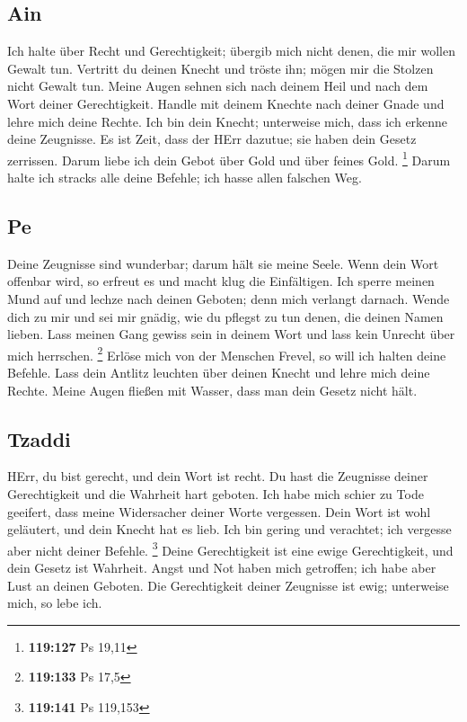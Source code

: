 \hypertarget{ain}{%
\subsection{Ain}\label{ain}}

 Ich halte über Recht und Gerechtigkeit; übergib mich
nicht denen, die mir wollen Gewalt tun.  Vertritt du
deinen Knecht und tröste ihn; mögen mir die Stolzen nicht Gewalt tun.
 Meine Augen sehnen sich nach deinem Heil und nach dem
Wort deiner Gerechtigkeit.  Handle mit deinem Knechte
nach deiner Gnade und lehre mich deine Rechte.  Ich bin
dein Knecht; unterweise mich, dass ich erkenne deine Zeugnisse.
 Es ist Zeit, dass der HErr dazutue; sie haben dein
Gesetz zerrissen.  Darum liebe ich dein Gebot über Gold
und über feines Gold. \footnote{\textbf{119:127} Ps 19,11}
 Darum halte ich stracks alle deine Befehle; ich hasse
allen falschen Weg.

\hypertarget{pe}{%
\subsection{Pe}\label{pe}}

 Deine Zeugnisse sind wunderbar; darum hält sie meine
Seele.  Wenn dein Wort offenbar wird, so erfreut es und
macht klug die Einfältigen.  Ich sperre meinen Mund auf
und lechze nach deinen Geboten; denn mich verlangt darnach.
 Wende dich zu mir und sei mir gnädig, wie du pflegst zu
tun denen, die deinen Namen lieben.  Lass meinen Gang
gewiss sein in deinem Wort und lass kein Unrecht über mich herrschen.
\footnote{\textbf{119:133} Ps 17,5}  Erlöse mich von der
Menschen Frevel, so will ich halten deine Befehle.  Lass
dein Antlitz leuchten über deinen Knecht und lehre mich deine Rechte.
 Meine Augen fließen mit Wasser, dass man dein Gesetz
nicht hält.

\hypertarget{tzaddi}{%
\subsection{Tzaddi}\label{tzaddi}}

 HErr, du bist gerecht, und dein Wort ist recht.
 Du hast die Zeugnisse deiner Gerechtigkeit und die
Wahrheit hart geboten.  Ich habe mich schier zu Tode
geeifert, dass meine Widersacher deiner Worte vergessen.
 Dein Wort ist wohl geläutert, und dein Knecht hat es
lieb.  Ich bin gering und verachtet; ich vergesse aber
nicht deiner Befehle. \footnote{\textbf{119:141} Ps 119,153}
 Deine Gerechtigkeit ist eine ewige Gerechtigkeit, und
dein Gesetz ist Wahrheit.  Angst und Not haben mich
getroffen; ich habe aber Lust an deinen Geboten.  Die
Gerechtigkeit deiner Zeugnisse ist ewig; unterweise mich, so lebe ich.

